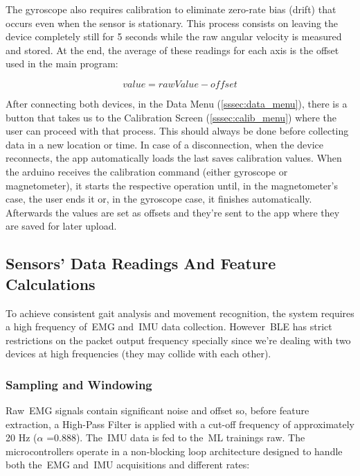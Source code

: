 The gyroscope also requires calibration to eliminate zero-rate bias (drift) that occurs even when the sensor is stationary. This process consists on leaving the device completely still for 5 seconds while the raw angular velocity 
is measured and stored. At the end, the average of these readings for each axis is the offset used in the main program:

\begin{equation}
  value = rawValue - offset
  \label{eq:gyroscopeValueEQ}
\end{equation}

After connecting both devices, in the Data Menu (\autoref{sssec:data_menu}), there is a button that takes us to the Calibration Screen (\autoref{sssec:calib_menu}) where the user can proceed with that process. This should 
always be done before collecting data in a new location or time. In case of a disconnection, when the device reconnects, the app automatically loads the last saves calibration values.
When the arduino receives the calibration command (either gyroscope or magnetometer), it starts the respective operation until, in the magnetometer's case, the user ends it or, in the gyroscope case, it finishes automatically. Afterwards 
the values are set as offsets and they're sent to the app where they are saved for later upload.


\subsection{Sensors' Data Readings And Feature Calculations}
\label{ssec:arduino_sensors_data_read}

To achieve consistent gait analysis and movement recognition, the system requires a high frequency of~\gls{EMG} and~\gls{IMU} data collection. However~\gls{BLE} has strict restrictions on the packet output frequency specially since we're 
dealing with two devices at high frequencies (they may collide with each other).

\subsubsection{Sampling and Windowing}
\label{sssec:sampling_windowing}

Raw~\gls{EMG} signals contain significant noise and offset so, before feature extraction, a High-Pass Filter is applied with a cut-off frequency of approximately 20 Hz ($\alpha$ =0.888). The~\gls{IMU} data is fed to the~\gls{ML} trainings raw.
The microcontrollers operate in a non-blocking loop architecture designed to handle both the~\gls{EMG} and~\gls{IMU} acquisitions and different rates:

